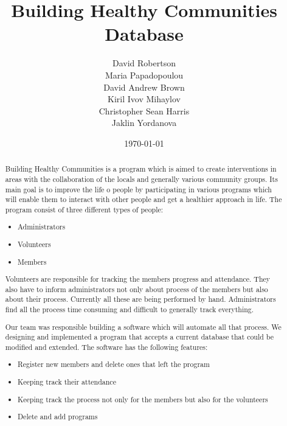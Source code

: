 \documentclass{l3proj}
\begin{document}
\title{Building Healthy Communities Database}

\author{David Robertson \\
Maria Papadopoulou \\
David Andrew Brown \\
Kiril Ivov Mihaylov \\
Christopher Sean Harris \\
Jaklin Yordanova}

\date{\today}

\maketitle

\begin{abstract}

Building Healthy Communities is a program which is aimed to create interventions in areas with the collaboration of the locals and generally various community groups. Its main goal is to improve the life o people by participating in various programs which will enable them to interact with other people and get a healthier approach in life. The program consist of three different types of people:
\begin{itemize}
	\item Administrators
	\item Volunteers
	\item Members
\end{itemize}
Volunteers are responsible for tracking the members progress and attendance. They also have to inform administrators not only about process of the members but also about their process. Currently all these are being performed by hand. Administrators find all the process time consuming and difficult to generally track everything. 

Our team was responsible building a software which will automate all that process. We designing and implemented a program that accepts a current database that could be modified and extended. The software has the following features:
\begin{itemize}
	\item Register new members and delete ones that left the program
	\item Keeping track their attendance
	\item Keeping track the process not only  for the members but also for the volunteers
	\item Delete and add programs
\end{itemize} 

\end{abstract}

\educationalconsent

\newpage

\end{document}
